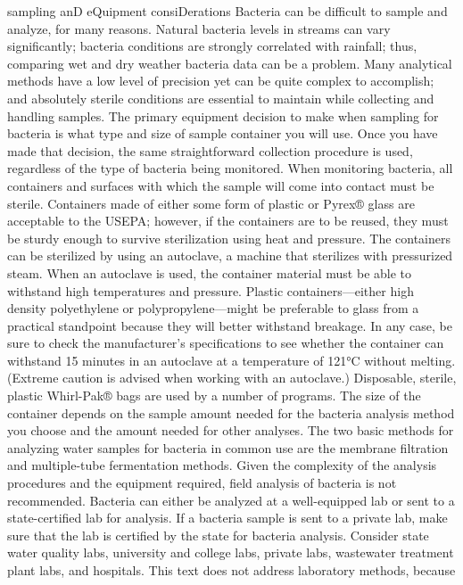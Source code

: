 \documentclass{article}
\begin{document}
sampling anD eQuipment consiDerations Bacteria can be difficult to
sample and analyze, for many reasons. Natural bacteria levels in streams
can vary significantly; bacteria conditions are strongly correlated with
rainfall; thus, comparing wet and dry weather bacteria data can be a
problem. Many analytical methods have a low level of precision yet can
be quite complex to accomplish; and absolutely sterile conditions are
essential to maintain while collecting and handling samples. The primary
equipment decision to make when sampling for bacteria is what type and
size of sample container you will use. Once you have made that decision,
the same straightforward collection procedure is used, regardless of the
type of bacteria being monitored. When monitoring bacteria, all
containers and surfaces with which the sample will come into contact
must be sterile. Containers made of either some form of plastic or
Pyrex® glass are acceptable to the USEPA; however, if the containers are
to be reused, they must be sturdy enough to survive sterilization using
heat and pressure. The containers can be sterilized by using an
autoclave, a machine that sterilizes with pressurized steam. When an
autoclave is used, the container material must be able to withstand high
temperatures and pressure. Plastic containers---either high density
polyethylene or polypropylene---might be preferable to glass from a
practical standpoint because they will better withstand breakage. In any
case, be sure to check the manufacturer's specifications to see whether
the container can withstand 15 minutes in an autoclave at a temperature
of 121°C without melting. (Extreme caution is advised when working with
an autoclave.) Disposable, sterile, plastic Whirl-Pak® bags are used by
a number of programs. The size of the container depends on the sample
amount needed for the bacteria analysis method you choose and the amount
needed for other analyses. The two basic methods for analyzing water
samples for bacteria in common use are the membrane filtration and
multiple-tube fermentation methods. Given the complexity of the analysis
procedures and the equipment required, field analysis of bacteria is not
recommended. Bacteria can either be analyzed at a well-equipped lab or
sent to a state-certified lab for analysis. If a bacteria sample is sent
to a private lab, make sure that the lab is certified by the state for
bacteria analysis. Consider state water quality labs, university and
college labs, private labs, wastewater treatment plant labs, and
hospitals. This text does not address laboratory methods, because
\end{document}
